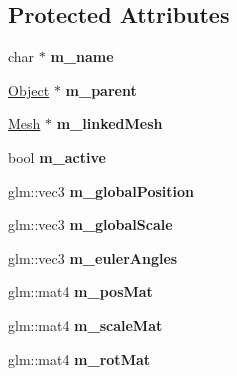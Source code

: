 \subsection*{Protected Attributes}
\begin{DoxyCompactItemize}
\item 
\hypertarget{class_object_ab37ae04046c449f0a8ab2833cfee5353}{}char $\ast$ {\bfseries m\+\_\+name}\label{class_object_ab37ae04046c449f0a8ab2833cfee5353}

\item 
\hypertarget{class_object_a2ee3d966f96dbabae641ad390d82a6f3}{}\hyperlink{class_object}{Object} $\ast$ {\bfseries m\+\_\+parent}\label{class_object_a2ee3d966f96dbabae641ad390d82a6f3}

\item 
\hypertarget{class_object_a82441da4d382a765bcf9c0a929f0a240}{}\hyperlink{class_mesh}{Mesh} $\ast$ {\bfseries m\+\_\+linked\+Mesh}\label{class_object_a82441da4d382a765bcf9c0a929f0a240}

\item 
\hypertarget{class_object_a9f5194b69d79120761526865270df0a6}{}bool {\bfseries m\+\_\+active}\label{class_object_a9f5194b69d79120761526865270df0a6}

\item 
\hypertarget{class_object_a6628ff13c375c8a2bc9cc36c8585943c}{}glm\+::vec3 {\bfseries m\+\_\+global\+Position}\label{class_object_a6628ff13c375c8a2bc9cc36c8585943c}

\item 
\hypertarget{class_object_ad717cc77240082806b13cd67338a4923}{}glm\+::vec3 {\bfseries m\+\_\+global\+Scale}\label{class_object_ad717cc77240082806b13cd67338a4923}

\item 
\hypertarget{class_object_a2b740c7fb22122a34286e0181fc69c8a}{}glm\+::vec3 {\bfseries m\+\_\+euler\+Angles}\label{class_object_a2b740c7fb22122a34286e0181fc69c8a}

\item 
\hypertarget{class_object_a6efcd32bee6c6acb64292a4798da7c0f}{}glm\+::mat4 {\bfseries m\+\_\+pos\+Mat}\label{class_object_a6efcd32bee6c6acb64292a4798da7c0f}

\item 
\hypertarget{class_object_a6657aad81115123d8d9bca416d012b46}{}glm\+::mat4 {\bfseries m\+\_\+scale\+Mat}\label{class_object_a6657aad81115123d8d9bca416d012b46}

\item 
\hypertarget{class_object_a9d7273efa1fbbe8a45c9042cf70222a5}{}glm\+::mat4 {\bfseries m\+\_\+rot\+Mat}\label{class_object_a9d7273efa1fbbe8a45c9042cf70222a5}


\end{DoxyCompactItemize}

